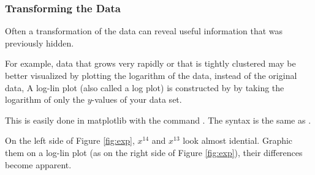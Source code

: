 \subsubsection*{Transforming the Data}

Often a transformation of the data can reveal useful information that was previously hidden.

For example, data that grows very rapidly or that is tightly clustered may be better visualized by plotting the logarithm of the data, instead of the original data, A log-lin plot (also called a log plot) is constructed by by taking the logarithm of only the $y$-values of your data set. 

This is easily done in matplotlib with the command .  The syntax is the same as .

On the left side of Figure \ref{fig:exp}, $x^{14}$ and $x^{13}$ look almost idential. Graphic them on a log-lin plot (as on the right side of Figure \ref{fig:exp}), their differences become apparent. 

